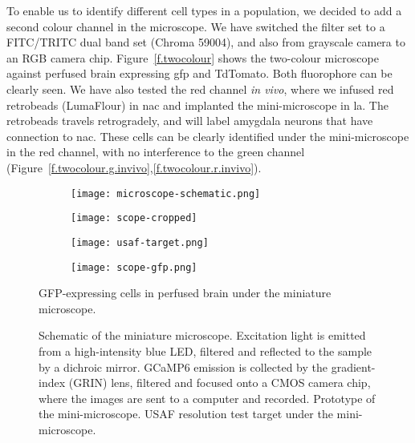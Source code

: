 To enable us to identify different cell types in a population, we decided to add a second colour channel in the microscope. We have switched the filter set to a FITC/TRITC dual band set (Chroma 59004), and also from grayscale camera to an RGB camera chip. Figure~\ref{f.twocolour} shows the two-colour microscope against perfused brain expressing \gls{gfp} and TdTomato. Both fluorophore can be clearly seen. We have also tested the red channel \textit{in vivo}, where we infused red retrobeads (LumaFlour) in \gls{nac} and implanted the mini-microscope in \gls{la}. The retrobeads travels retrogradely, and will label amygdala neurons that have connection to \gls{nac}. These cells can be clearly identified under the mini-microscope in the red channel, with no interference to the green channel (Figure~\ref{f.twocolour.g.invivo},\ref{f.twocolour.r.invivo}). 



\begin{figure}[h]
    \begin{subfigure}[t]{.55\textwidth}
        \centering
        \texttt{[image: microscope-schematic.png]}
        \caption{\label{f.scope-schema}}
    \end{subfigure}
    \begin{subfigure}[t]{.45\textwidth}
        \centering
        \texttt{[image: scope-cropped]}
        \caption{\label{f.scope}}
    \end{subfigure}
    \begin{subfigure}[t]{.5\textwidth}
        \centering
        \texttt{[image: usaf-target.png]}
        \caption{\label{f.usaf}}
    \end{subfigure}
    \begin{subfigure}[t]{.5\textwidth}
        \centering
        \texttt{[image: scope-gfp.png]}
        \caption{\label{f.scope-gfp}}
    \end{subfigure}
    \caption{ Schematic of the miniature microscope. Excitation light is emitted from a high-intensity blue LED, filtered and reflected to the sample by a dichroic mirror. GCaMP6 emission is collected by the gradient-index (GRIN) lens, filtered and focused onto a CMOS camera chip, where the images are sent to a computer and recorded. 
              Prototype of the mini-microscope.
              USAF resolution test target under the mini-microscope.}
              GFP-expressing cells in perfused brain under the miniature microscope.
\end{figure}

